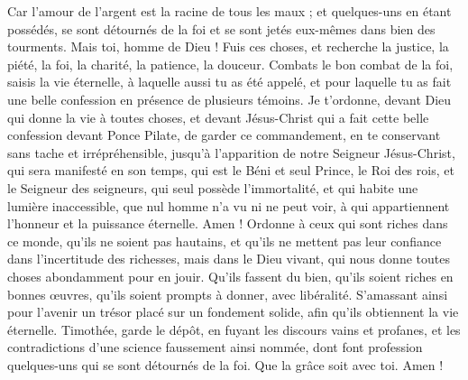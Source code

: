 \begin{multicols}{2}
Car l'amour de l'argent est la racine de tous les maux ; et quelques-uns en étant possédés, se sont détournés de la foi et se sont jetés eux-mêmes dans bien des tourments.
Mais toi, homme de Dieu ! Fuis ces choses, et recherche la justice, la piété, la foi, la charité, la patience, la douceur.
Combats le bon combat de la foi, saisis la vie éternelle, à laquelle aussi tu as été appelé, et pour laquelle tu as fait une belle confession en présence de plusieurs témoins.
Je t'ordonne, devant Dieu qui donne la vie à toutes choses, et devant Jésus-Christ qui a fait cette belle confession devant Ponce Pilate,
de garder ce commandement, en te conservant sans tache et irrépréhensible, jusqu'à l'apparition de notre Seigneur Jésus-Christ,
qui sera manifesté en son temps, qui est le Béni et seul Prince, le Roi des rois, et le Seigneur des seigneurs,
qui seul possède l'immortalité, et qui habite une lumière inaccessible, que nul homme n'a vu ni ne peut voir, à qui appartiennent l'honneur et la puissance éternelle. Amen !
Ordonne à ceux qui sont riches dans ce monde, qu'ils ne soient pas hautains, et qu'ils ne mettent pas leur confiance dans l'incertitude des richesses, mais dans le Dieu vivant, qui nous donne toutes choses abondamment pour en jouir.
Qu'ils fassent du bien, qu'ils soient riches en bonnes œuvres, qu'ils soient prompts à donner, avec libéralité.
S’amassant ainsi pour l'avenir un trésor placé sur un fondement solide, afin qu'ils obtiennent la vie éternelle.
Timothée, garde le dépôt, en fuyant les discours vains et profanes, et les contradictions d'une science faussement ainsi nommée,
dont font profession quelques-uns qui se sont détournés de la foi. Que la grâce soit avec toi. Amen !
\PPE{}
\end{multicols}
